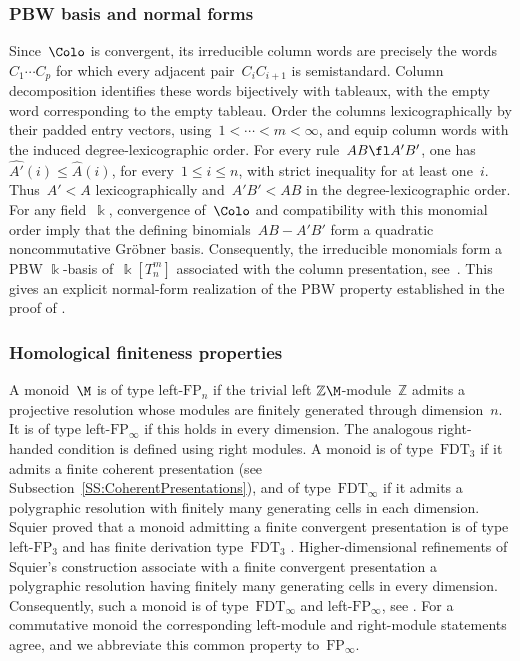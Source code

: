 \documentclass[a4paper, twoside, 11pt, english]{article}
\begin{document}
\subsubsection{PBW basis and normal forms}

Since~$\Colo$ is convergent, its irreducible column words are
precisely the words~$C_1\cdots C_p$ for which every adjacent
pair~$C_iC_{i+1}$ is semistandard.
Column decomposition identifies these words bijectively with  tableaux, with the empty word corresponding
to the empty tableau.
Order the columns lexicographically by their padded entry vectors,
using~$1<\cdots<m<\infty$, and equip column words with the induced
degree-lexicographic order.
For every rule~$AB\fl A'B'$, one has~$\widehat{A'}(i)\le\widehat A(i)$, for every~$1\le i\le n$, with strict inequality for at least one~$i$.
Thus~$A'<A$ lexicographically and~$A'B'<AB$ in the
degree-lexicographic order.
For any field~$\Bbbk$, convergence of~$\Colo$ and compatibility
with this monomial order imply that the defining
binomials~$AB-A'B'$ form a quadratic noncommutative
Gr\"obner basis.
Consequently, the irreducible monomials form a PBW
$\Bbbk$-basis of~$\Bbbk[T_n^m]$ associated with the column
presentation, see~\cite[Proposition~3.5.4]{GuiraudHoffbeckMalbos19}.
This gives an explicit normal-form realization of the PBW
property established in the proof of
\cite[Corollary~2.14]{DaughertyGonzalezMunizOcalPanTorres25}.



\subsubsection{Homological finiteness properties}

A monoid~$\M$ is of type left-$\mathrm{FP}_n$ if the trivial left
$\mathbb Z\M$-module~$\mathbb Z$ admits a projective resolution whose
modules are finitely generated through dimension~$n$. It is of type
left-$\mathrm{FP}_\infty$ if this holds in every dimension. The analogous
right-handed condition is defined using right modules.
A monoid is of type~$\mathrm{FDT}_3$ if it admits a finite
coherent presentation (see Subsection~\ref{SS:CoherentPresentations}), and of type~$\mathrm{FDT}_\infty$
if it admits a polygraphic resolution with finitely many
generating cells in each dimension.
Squier proved that a monoid admitting a finite convergent presentation is
of type left-$\mathrm{FP}_3$ and has finite derivation type~$\mathrm{FDT}_3$
\cite{Squier87,Squier94}. Higher-dimensional refinements of Squier's
construction associate with a finite convergent presentation a polygraphic
resolution having finitely many generating cells in every dimension.
Consequently, such a monoid is of type~$\mathrm{FDT}_\infty$ and
left-$\mathrm{FP}_\infty$,  see
\cite{GuiraudMalbos09, GuiraudMalbos12advances}.
For a commutative monoid the corresponding left-module and right-module
statements agree, and we abbreviate this common property to~$\mathrm{FP}_\infty$.
\end{document}
